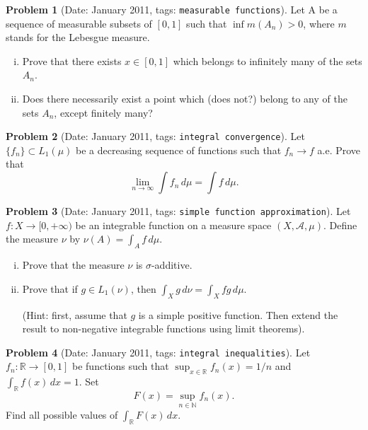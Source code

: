 \documentclass[11pt, notitlepage]{article}
\theoremstyle{definition}
\theoremstyle{definition}
\theoremstyle{definition}
\newtheorem{probstate}{Problem}
\theoremstyle{remark}
\newenvironment{problem}[2]{
    \begin{probstate}[Date: #1, tags: \texttt{#2}]
}
{
  \end{probstate}
}
\begin{document}
\begin{problem}{January 2011}{measurable functions}
  \item Let A be a sequence of measurable subsets of $[0,1]$ such that $\inf m(A_n)>0$, where $m$ stands for the Lebesgue measure.
   \begin{enumerate}[(i)]
    \item Prove that there exists $x \in [0,1]$ which belongs to infinitely many of the sets $A_n$.
    \item Does there necessarily exist a point which {\color{red} (does not?)} belong to any of the sets $A_n$, except finitely many?
   \end{enumerate}
\end{problem}

\begin{problem}{January 2011}{integral convergence}
  Let $\{f_n\} \subset L_1(\mu)$ be a decreasing sequence of functions such that $f_n \to f$ a.e.
  Prove that
    \[
      \lim_{n \to \infty} \int f_n \, d \mu = \int f \, d \mu.
    \]
\end{problem}

\begin{problem}{January 2011}{simple function approximation}
  Let $f:X \to [0, +\infty)$ be an integrable function on
    a measure space $(X, \mathcal{A},\mu)$.
    Define the measure $\nu$ by $\nu(A)=\int_A f \, d \mu$.
    \begin{enumerate}[(i)]
        \item Prove that the measure $\nu$ is $\sigma$-additive.

        \item Prove that if
        $g \in L_1(\nu)$, then
        $\int_X g \, d \nu =\int_X fg \, d \mu$.

        (Hint: first, assume that $g$ is a simple positive
        function. Then extend the result to non-negative
        integrable functions using limit theorems).
    \end{enumerate}
\end{problem}

\begin{problem}{January 2011}{integral inequalities}
  Let $f_n: \mathbb{R} \to [0, 1]$ be functions such that
 $\sup_{x \in \mathbb{R}} f_n(x)=1/n$ and $\int_{\mathbb{R}} f(x) \, dx=1$. Set
 \[
  F(x)= \sup_{n \in \mathbb{N}} f_n(x).
 \]
 Find all possible values of $\int_{\mathbb{R}} F(x) \, dx$.

\end{problem}
\end{document}

